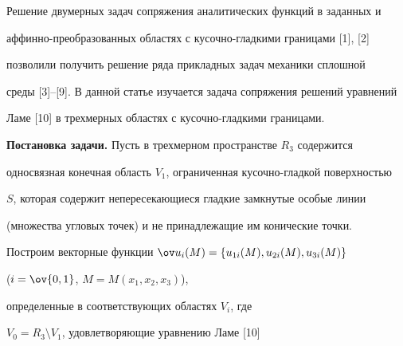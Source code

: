  


 


\date{} 




\pagestyle{plain} %


 




\maketitle 


\label{begin} 


 


 


 


 


Решение двумерных задач сопряжения аналитических функций в заданных и  


аффинно-пре\-образованных областях с кусочно-гладкими границами [1], [2]  


позволили получить решение ряда прикладных задач механики сплошной  


среды [3]--[9]. В данной статье изучается задача сопряжения решений уравнений  


Ламе [10] в трехмерных областях с кусочно-гладкими границами. 


\medskip 


 


{\bf Постановка задачи.} Пусть в трехмерном пространстве $R_3$ содержится  


односвязная конечная область $V_1$, ограниченная кусочно-гладкой поверхностью  


$S$, которая содержит непересекающиеся гладкие замкнутые особые линии  


(множества угловых точек) и не принадлежащие им конические точки. 


 


Построим векторные функции $\ov u_i(M)=\{u_{1i}(M),u_{2i}(M),u_{3i}(M)\}$ 


($i=\ov{0,1}$, $M=M(x_1,x_2,x_3)$), 


определенные в соответствующих областях $V_i$, где 


$V_0=R_3\setminus V_1$, удовлетворяющие уравнению Ламе [10] 


